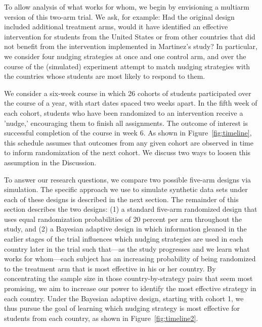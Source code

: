 \documentclass{acm_proc_article-sp}
\begin{document}
To allow analysis of what works for whom, we begin by envisioning a multiarm version of this two-arm trial. 
We ask, for example: Had the original design included additional treatment arms, would it have identified an effective intervention for students from the United States or from other countries that did not benefit from the intervention implemented in Martinez’s study? 
In particular, we consider four nudging strategies at once and one control arm, and over the course of the (simulated) experiment attempt to match nudging strategies with the countries whose students are most likely to respond to them.

We consider a six-week course in which 26 cohorts of students participated over the course of a year, with start dates spaced two weeks apart. 
In the fifth week of each cohort, students who have been randomized to an intervention receive a 'nudge,' encouraging them to finish all assignments. 
The outcome of interest is successful completion of the course in week 6. 
As shown in Figure~\ref{fig:timeline}, this schedule assumes that outcomes from any given cohort are observed in time to inform randomization of the next cohort. 
We discuss two ways to loosen this assumption in the Discussion. 

\begin{figure*}
\centering
{}
\caption{We consider a six-week course in which 26 cohorts of students participated over the course of a year, with start dates spaced two weeks apart. For illustrative purposes, we show the first 3 of 26 cohorts here.}
\label{fig:timeline}
\end{figure*}

To answer our research questions, we compare two possible five-arm designs via simulation. 
The specific approach we use to simulate synthetic data sets under each of these designs is described in the next section. 
The remainder of this section describes the two designs: (1) a standard five-arm randomized design that uses equal randomization probabilities of 20 percent per arm throughout the study, and (2) a Bayesian adaptive design in which information gleaned in the earlier stages of the trial influences which nudging strategies are used in each country later in the trial such that—as the study progresses and we learn what works for whom—each subject has an increasing probability of being randomized to the treatment arm that is most effective in his or her country. 
By concentrating the sample size in those country-by-strategy pairs that seem most promising, we aim to increase our power to identify the most effective strategy in each country. 
Under the Bayesian adaptive design, starting with cohort 1, we thus pursue the goal of learning which nudging strategy is most effective for students from each country, as shown in Figure~\ref{fig:timeline2}. 
\end{document}
